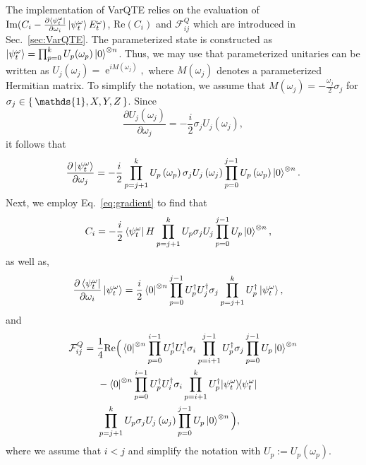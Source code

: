 \documentclass[twocolumn, aps, pra, superscriptaddress]{revtex4-1}
\DeclareMathOperator{\ee}{e}
\newcommand{\proj}[1]{|#1\rangle\!\langle #1|}
\begin{document}
The implementation of VarQTE relies on the evaluation of
$\text{Im}(C_i - \textstyle{\frac{\partial \bra{\psi^{\omega}_t}}{\partial \omega_i}\ket{\psi^{\omega}_t}E_t^{\omega}})$, $\text{Re}(C_i)$ and $
\mathcal{F}^Q_{ij}$ which are introduced in Sec.~\ref{sec:VarQTE}.
The parameterized state is constructed as $\ket{\psi^{\omega}_t} = \prod_{p=0}^k U_p(\omega_p)\ket{0}^{\otimes n}$. Thus, we may use that parameterized unitaries can be written as $\textstyle{U_j\left(\omega_j\right) = \ee^{iM\left(\omega_j\right)}}, $
where $M\left(\omega_j\right)$ denotes a parameterized Hermitian matrix. 
To simplify the notation, we assume that $M(\omega_j)=\textstyle{ {-\frac{\omega_j}{2}\sigma_j}}$ for $\sigma_j\in\set{\mathds{1}, X, Y, Z}$.
Since
\begin{equation}
\frac{\partial U_j\left(\omega_j\right)}{\partial\omega_j} = -\frac{i}{2} \sigma_jU_j\left(\omega_j\right),
\end{equation}
it follows that
\begin{align}
\label{eq:gradient}
\frac{\partial\ket{\psi^{\omega}_t}}{\partial\omega_j} = -\frac{i}{2}\prod\limits_{p=j+1}^k U_p\left(\omega_p\right) \sigma_jU_j\left(\omega_j\right)\prod\limits_{p=0}^{j-1} U_p\left(\omega_p\right)\ket{0}^{\otimes n}.
\end{align}
Next, we employ Eq.~\eqref{eq:gradient} to find that
\begin{align}
   C_i &= -\frac{i}{2}\bra{\psi^{\omega}_t} H\prod\limits_{p=j+1}^k U_p \sigma_jU_j\prod\limits_{p=0}^{j-1} U_p\ket{0}^{\otimes n},
\end{align}
as well as,
\begin{align}
    &\frac{\partial \bra{\psi^{\omega}_t}}{\partial \omega_i}\ket{\psi^{\omega}_t}
=  \frac{i}{2}\bra{0}^{\otimes n}\prod\limits_{p=0}^{j-1} U^{\dagger}_p U^{\dagger}_j\sigma_j\prod\limits_{p=j+1}^k U^{\dagger}_p\ket{\psi^{\omega}_t},
\end{align}
and
\begin{align}
\mathcal{F}^Q_{ij} &= \frac{1}{4}
\text{Re}\Big(\bra{0}^{\otimes n} \prod\limits_{p=0}^{i-1} U^{\dagger}_pU^{\dagger}_i\sigma_i\prod\limits_{p=i+1}^{j-1} U^{\dagger}_p
 \sigma_j\prod\limits_{p=0}^{j-1} U_p\ket{0}^{\otimes n}\nonumber\\
&\hspace{5mm} -\bra{0}^{\otimes n} \prod\limits_{p=0}^{i-1} U^{\dagger}_pU^{\dagger}_i\sigma_i\prod\limits_{p=i+1}^k U^{\dagger}_p \proj{\psi^{\omega}_t}
\nonumber\\
&\hspace{5mm}\prod\limits_{p=j+1}^k U_p \sigma_jU_j\left(\omega_j\right)\prod\limits_{p=0}^{j-1} U_p\ket{0}^{\otimes n}
\Big),
\end{align}
where we assume that $i<j$ and simplify the notation with $U_p := U_p\left(\omega_p\right)$.
\end{document}
